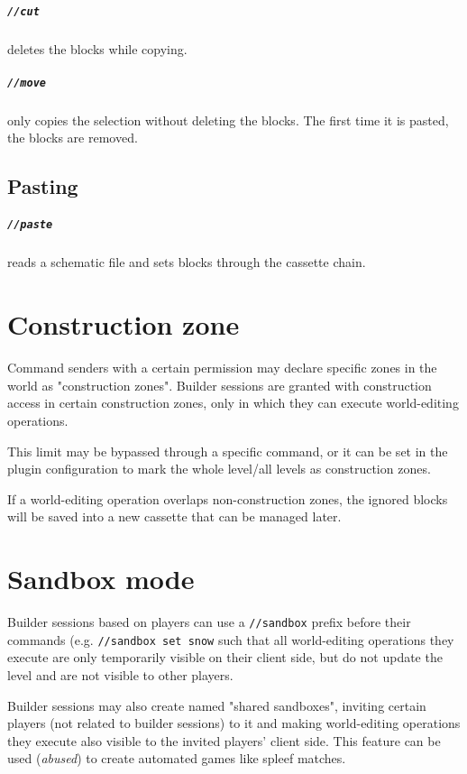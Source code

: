 \documentclass{report}
\begin{document}
				\paragraph{\texttt{//cut}} deletes the blocks while copying.
				\paragraph{\texttt{//move}} only copies the selection without deleting the blocks. The first time it is
				pasted, the blocks are removed.
			\section{Pasting}
				\paragraph{\texttt{//paste}} reads a schematic file and sets blocks through the cassette chain.

		\chapter{Construction zone}
			Command senders with a certain permission may declare specific zones in the world as "construction zones".
			Builder sessions are granted with construction access in certain construction zones, only in which they can
			execute world-editing operations.

			This limit may be bypassed through a specific command, or it can be set in the plugin configuration to mark
			the whole level/all levels as construction zones.

			If a world-editing operation overlaps non-construction zones, the ignored blocks will be saved into a new
			cassette that can be managed later.

		\chapter{Sandbox mode}
			Builder sessions based on players can use a \texttt{//sandbox} prefix before their commands (e.g.
			\texttt{//sandbox set snow} such that all world-editing operations they execute are only temporarily visible
			on their client side, but do not update the level and are not visible to other players.

			Builder sessions may also create named "shared sandboxes", inviting certain players (not related to builder
			sessions) to it and making world-editing operations they execute also visible to the invited players' client
			side. This feature can be used (\emph{abused}) to create automated games like spleef matches.
\end{document}
